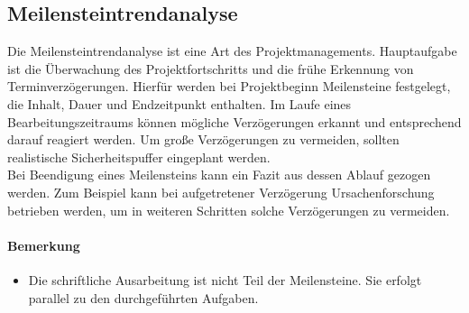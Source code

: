 \subsection{Meilensteintrendanalyse}
Die Meilensteintrendanalyse ist eine Art des Projektmanagements. Hauptaufgabe ist die Überwachung des Projektfortschritts und die frühe Erkennung von Terminverzögerungen. Hierfür werden bei Projektbeginn Meilensteine festgelegt, die Inhalt, Dauer und Endzeitpunkt enthalten. Im Laufe eines Bearbeitungszeitraums können mögliche Verzögerungen erkannt und entsprechend darauf reagiert werden. Um große Verzögerungen zu vermeiden, sollten realistische Sicherheitspuffer eingeplant werden. \\
Bei Beendigung eines Meilensteins kann ein Fazit aus dessen Ablauf gezogen werden. Zum Beispiel kann bei aufgetretener Verzögerung Ursachenforschung betrieben werden, um in weiteren Schritten solche Verzögerungen zu vermeiden. 

\paragraph{Bemerkung}
\begin{itemize}
\item Die schriftliche Ausarbeitung ist nicht Teil der Meilensteine. Sie erfolgt parallel zu den durchgeführten Aufgaben.
\end{itemize}

